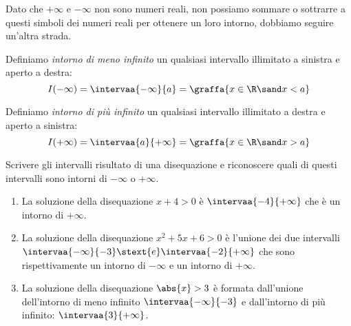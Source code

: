 Dato che \(+\infty\) e \(-\infty\) non sono numeri reali, non possiamo 
sommare o sottrarre a questi simboli dei numeri reali per ottenere un loro 
intorno, dobbiamo seguire un'altra strada.


\begin{newdef}{}{}
Definiamo \emph{intorno di meno infinito} un qualsiasi intervallo illimitato 
a sinistra e aperto a destra:
\[I(-\infty) = \intervaa{-\infty}{a} = \graffa{x \in \R \sand x < a}\]
\end{newdef}

\begin{center} \intornomenoinf \end{center}

\begin{newdef}{}{}
Definiamo \emph{intorno di più infinito} un qualsiasi intervallo illimitato a 
destra e aperto a sinistra:
\[I(+\infty) = \intervaa{a}{+\infty} = \graffa{x \in \R \sand x > a}\]
\end{newdef}

\begin{center} \intornopiuinf \end{center}

\begin{esempio} Scrivere gli intervalli risultato di una disequazione e 
riconoscere quali di questi intervalli sono intorni di 
\(-\infty\) o \(+\infty\).
\begin{enumerate}[label=\alph*)]
\item La soluzione della disequazione \(x+4 > 0\) \quad è \quad 
\(\intervaa{-4}{+\infty}\) \quad 
che è un intorno di \(+\infty\).
\item La soluzione della disequazione \(x^2+5x+6 > 0\) \quad è 
l'unione dei due intervalli \\
\(\intervaa{-\infty}{-3} \stext{e} \intervaa{-2}{+\infty}\)
che sono rispettivamente un intorno di \(-\infty\) e un intorno di 
\(+\infty\).
\item La soluzione della disequazione \(\abs{x}>3\) \quad è formata 
dall'unione dell'intorno di meno infinito \(\intervaa{-\infty}{-3}\) e 
dall'intorno di più infinito: \(\intervaa{3}{+\infty}\).
\end{enumerate} 
\end{esempio}

